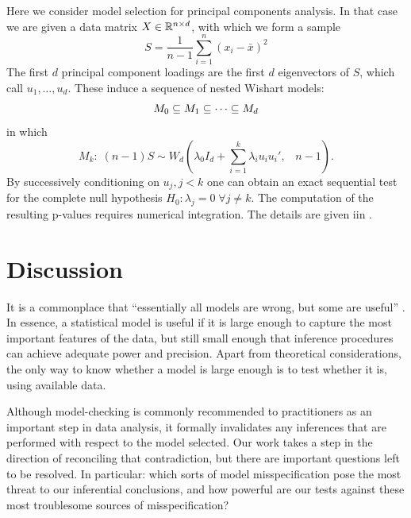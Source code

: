 \documentclass{article}
\begin{document}
Here we consider model selection for   principal components analysis. In that case we are given a data matrix $X \in \mathbb{R}^{n\times d}$, with which we form a sample %
\[
S = \frac{1}{n-1} \sum_{i=1}^n(x_i - \bar x)^2
\]
The first $d$ principal component loadings are the first $d$ eigenvectors of $S$, which call $u_1,\ldots, u_d$. These induce a sequence of nested Wishart models:
\[
M_0 \subseteq M_1 \subseteq \cdots \subseteq M_d
\]
in which
\begin{equation}
  M_k:\; (n-1) S \sim W_d\left(\lambda_0 I_d + \sum_{i=1}^k     \lambda_i u_i u_i', \;\;\; n-1\right).
\end{equation}
 By successively conditioning on $u_j, j<k$ one can obtain an exact sequential test
for the complete null hypothesis $H_0: \lambda_j=0 \; \forall j \neq k$.  The computation of the resulting p-values requires numerical integration.
The details are given iin \citet{choi2014selecting}.


\section{Discussion}
\label{sec:pca}

It is a commonplace that ``essentially all models are wrong, but some are useful'' \citep{box1987empirical}. In essence, a statistical model is useful if it is large enough to capture the most important features of the data, but still small enough that inference procedures can achieve adequate power and precision. Apart from theoretical considerations, the only way to know whether a model is large enough is to test whether it is, using available data.

Although model-checking is commonly recommended to practitioners as an important step in data analysis, it formally invalidates any inferences that are performed with respect to the model selected. Our work takes a step in the direction of reconciling that contradiction, but there are important questions left to be resolved. In particular: which sorts of model misspecification pose the most threat to our inferential conclusions, and how powerful are our tests against these most troublesome sources of misspecification? 
\end{document}
